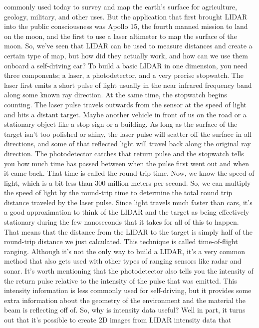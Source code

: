 commonly used today to survey and map the earth's
surface for agriculture, geology, military, and other uses. But the application that
first brought LIDAR into the public
consciousness was Apollo 15, the fourth manned mission
to land on the moon, and the first to use a laser altimeter
to map the surface of the moon. So, we've seen that LIDAR can be used to measure distances and create
a certain type of map, but how did they actually work, and how can we use them
onboard a self-driving car? To build a basic LIDAR in one dimension, you need three components; a laser, a photodetector, and a very precise stopwatch. The laser first emits
a short pulse of light usually in the near infrared frequency band
along some known ray direction. At the same time,
the stopwatch begins counting. The laser pulse travels
outwards from the sensor at the speed of light and
hits a distant target. Maybe another vehicle in
front of us on the road or a stationary object like
a stop sign or a building. As long as the surface of the target
isn't too polished or shiny, the laser pulse will scatter off
the surface in all directions, and some of that reflected light will travel back along
the original ray direction. The photodetector catches that return
pulse and the stopwatch tells you how much time has passed between when the pulse first went out
and when it came back. That time is called the round-trip time. Now, we know the speed of light, which is a bit less than 300
million meters per second. So, we can multiply the speed of
light by the round-trip time to determine the total round trip distance
traveled by the laser pulse. Since light travels
much faster than cars, it's a good approximation to think
of the LIDAR and the target as being effectively stationary
during the few nanoseconds that it takes for all of this to happen. That means that the distance from
the LIDAR to the target is simply half of the round-trip distance
we just calculated. This technique is called
time-of-flight ranging. Although it's not the only way
to build a LIDAR, it's a very common method
that also gets used with other types of ranging sensors
like radar and sonar. It's worth mentioning that the photodetector also
tells you the intensity of the return pulse relative to the
intensity of the pulse that was emitted. This intensity information is less
commonly used for self-driving, but it provides some extra information
about the geometry of the environment and the material
the beam is reflecting off of. So, why is intensity data useful? Well in part, it turns out that it's
possible to create 2D images from LIDAR intensity data that
